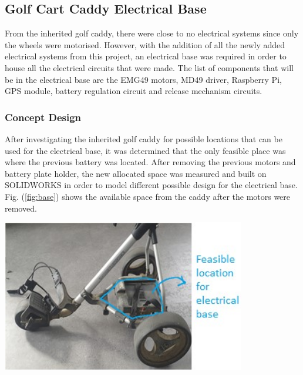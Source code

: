 \documentclass[11pt,landscape]{article}
\newenvironment{Figure}
  {\par\medskip\noindent\minipage{\linewidth}}
  {\endminipage\par\medskip}
\begin{document}
\newpage
\begin{multicols}{2}
    \subsection{Golf Cart Caddy Electrical Base}
    From the inherited golf caddy, there were close to no electrical systems
    since only the wheels were motorised. However, with the addition of all the
    newly added electrical systems from this project, an electrical base was
    required in order to house all the electrical circuits that were made. The
    list of components that will be in the electrical base are the EMG49 motors,
    MD49 driver, Raspberry Pi, GPS module, battery regulation circuit and
    release mechanism circuits.
    
    \subsubsection{Concept Design}
    After investigating the inherited golf caddy for possible locations that can
    be used for the electrical base, it was determined that the only
    feasible place was where the previous battery was located. After removing the
    previous motors and battery plate holder, the new allocated space was
    measured and built on SOLIDWORKS in order to model different possible design
    for the electrical base. Fig. (\ref{fig:base}) shows the available space
    from the caddy after the motors were removed.
    
    \begin{Figure}
        \begin{center}
            \includegraphics[width=0.8\textwidth]{Figure22.jpg}
            \label{fig:base}
        \end{center}
    \end{Figure}
    

\end{multicols}
\end{document}
